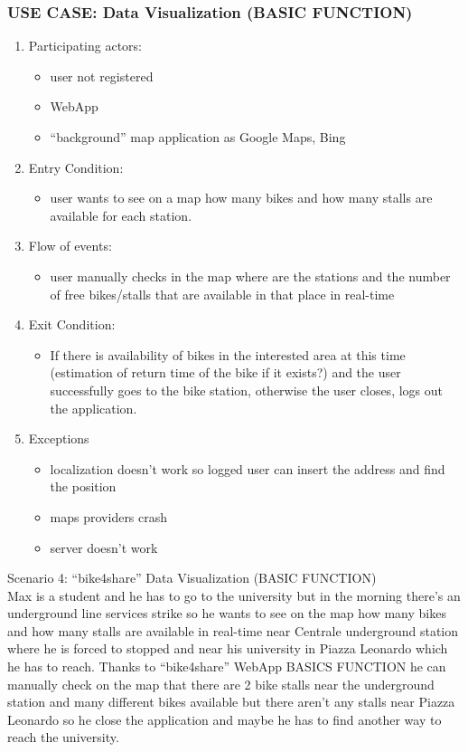 \documentclass{article}
\begin{document}
\subsubsection{\textbf{USE CASE}: Data Visualization (BASIC FUNCTION)}
\begin{enumerate}
\item Participating actors: 
\begin{itemize}
    \item user not registered
    \item WebApp
    \item “background” map application as Google Maps, Bing
\end{itemize}
\item Entry Condition: 
\begin{itemize}
    \item user wants to see on a map how many bikes and how many stalls are available for each station.
\end{itemize}
\item Flow of events: 
\begin{itemize}
    \item user manually checks in the map where are the stations and the number of free bikes/stalls that are available in that place in real-time
\end{itemize}
\item Exit Condition: 
\begin{itemize}
    \item If there is availability of bikes in the interested area at this time (estimation of return time of the bike if it exists?) and the user successfully goes to the bike station, otherwise the user closes, logs out  the application.
\end{itemize}
\item Exceptions
\begin{itemize}
    \item localization doesn’t work so logged user can insert the address and find the position
    \item maps providers crash
    \item server doesn’t work
\end{itemize}
\end{enumerate}

 Scenario 4: “bike4share” Data Visualization (BASIC FUNCTION) \\
Max is a student and he has to go to the university but in the morning there’s an underground line services strike so he wants to see on the map how many bikes and how many stalls are available in real-time near Centrale underground station where he is forced to stopped and near his university in Piazza Leonardo which he has to reach. 
Thanks to “bike4share” WebApp BASICS FUNCTION he can manually check on the map that there are 2 bike stalls near the underground station and many different bikes available but there aren’t any stalls near Piazza Leonardo so he close the application and maybe he has to find another way to reach the university.
\end{document}
